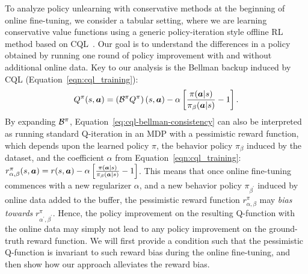 To analyze policy unlearning with conservative methods at the beginning of online fine-tuning, we consider a tabular setting, where we are learning conservative value functions using a generic policy-iteration style offline RL method based on CQL~\citep{kumar2020conservative}. Our goal is to understand the differences in a policy obtained by running one round of policy improvement with and without additional online data. Key to our analysis is the Bellman backup induced by CQL (Equation~\ref{eqn:cql_training}):
\begin{align}
\label{eq:cql-bellman-consistency}
\footnotesize{
    Q^\pi(\bs, \mathbf{a}) = \left(\mathcal{B}^\pi Q^\pi \right)(\bs, \mathbf{a}) - \alpha \left[ \frac{\pi(\mathbf{a}|\bs)}{\pi_\beta(\mathbf{a}|\bs)} - 1 \right].}
\end{align}
By expanding $\mathcal B^\pi$, Equation~\ref{eq:cql-bellman-consistency} can also be interpreted as running standard Q-iteration in an MDP with a pessimistic reward function, which depends upon the learned policy $\pi$, the behavior policy $\pi_\beta$ induced by the dataset, and the coefficient $\alpha$ from Equation~\ref{eqn:cql_training}:
$r^\pi_{\alpha,\beta}(s,\boldsymbol{a}) = r(s,\boldsymbol{a}) - \alpha\left[  \frac{\pi(\boldsymbol{a}|s)}{\pi_\beta(\boldsymbol{a}|s)} - 1  \right]$. This means that once online fine-tuning commences with a new regularizer $\alpha$, and a new behavior policy $\pi_{\beta^\prime}$ induced by online data added to the buffer, the pessimistic reward function $r^\pi_{\alpha,\beta}$ may {\em bias towards} $r^\pi_{\alpha^\prime,\beta^\prime}$. Hence, the policy improvement on the resulting Q-function with the online data may simply not lead to any policy improvement on the ground-truth reward function. We will first provide a condition such that the pessimistic Q-function is invariant to such reward bias during the online fine-tuning, and then show how our approach alleviates the reward bias.


